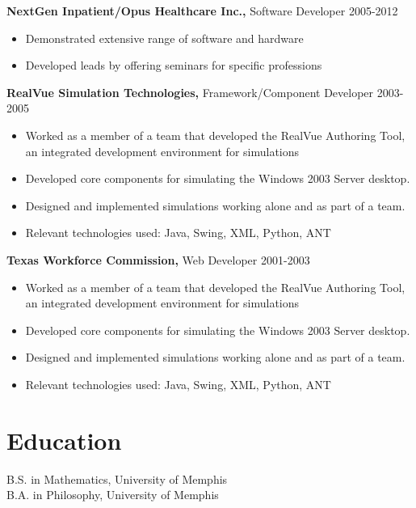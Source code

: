 \documentclass[margin]{res}
\begin{document}
\begin{resume}
{\bf NextGen Inpatient/Opus Healthcare Inc.,} Software Developer \hfill
2005-2012
\begin{itemize} \itemsep -2pt
\item  Demonstrated extensive range of software and
  hardware

\item Developed leads by offering seminars for specific
  professions

\end{itemize}

{\bf RealVue Simulation Technologies,} Framework/Component Developer \hfill
2003-2005
\begin{itemize} \itemsep -2pt
\item Worked as a member of a team that developed the RealVue Authoring Tool, an integrated development
  environment for simulations
\item Developed core components for simulating the Windows 2003 Server desktop.
\item Designed and implemented simulations working alone and as part of a team.
\item Relevant technologies used: Java, Swing, XML, Python, ANT
\end{itemize}

{\bf Texas Workforce Commission,} Web Developer \hfill
2001-2003
\begin{itemize} \itemsep -2pt
\item Worked as a member of a team that developed the RealVue Authoring Tool, an integrated development
  environment for simulations
\item Developed core components for simulating the Windows 2003 Server desktop.
\item Designed and implemented simulations working alone and as part of a team.
\item Relevant technologies used: Java, Swing, XML, Python, ANT
\end{itemize}


\section{Education}
B.S. in Mathematics, University of Memphis \\
B.A. in Philosophy, University of Memphis \\

\end{resume}
\end{document}
